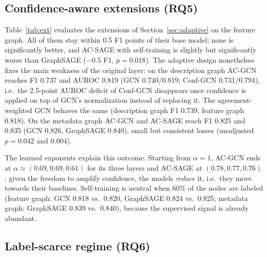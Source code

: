 \documentclass[conference]{IEEEtran}
\begin{document}
\subsection{Confidence-aware extensions (RQ5)}

\begin{table}[t]
\caption{Confidence-aware extensions on the feature graph (mean $\pm$ std over 25 runs). $p$: paired Wilcoxon of F1 vs.\ the base model of each block, Holm-corrected within the block.}
\label{tab:ext}
\centering
{}
\end{table}

Table~\ref{tab:ext} evaluates the extensions of Section~\ref{sec:adaptive} on the feature graph. All of them stay within 0.5 F1 points of their base model; none is significantly better, and AC-SAGE with self-training is slightly but significantly worse than GraphSAGE ($-0.5$ F1, $p=0.018$). The adaptive design nonetheless fixes the main weakness of the original layer: on the description graph AC-GCN reaches F1 0.737 and AUROC 0.819 (GCN 0.740/0.819; Conf-GCN 0.731/0.794), i.e.\ the 2.5-point AUROC deficit of Conf-GCN disappears once confidence is applied on top of GCN's normalization instead of replacing it. The agreement-weighted GCN behaves the same (description graph F1 0.739, feature graph 0.818). On the metadata graph AC-GCN and AC-SAGE reach F1 0.825 and 0.835 (GCN 0.826, GraphSAGE 0.840), small but consistent losses (unadjusted $p=0.042$ and $0.004$).

The learned exponents explain this outcome. Starting from $\alpha=1$, AC-GCN ends at $\alpha\approx(0.69, 0.69, 0.61)$ for its three layers and AC-SAGE at $(0.78, 0.77, 0.76)$: given the freedom to amplify confidence, the models \emph{reduce} it, i.e.\ they move towards their baselines. Self-training is neutral when 60\% of the nodes are labeled (feature graph: GCN 0.818 vs.\ 0.820, GraphSAGE 0.824 vs.\ 0.825; metadata graph: GraphSAGE 0.839 vs.\ 0.840), because the supervised signal is already abundant.

\subsection{Label-scarce regime (RQ6)}
\end{document}
